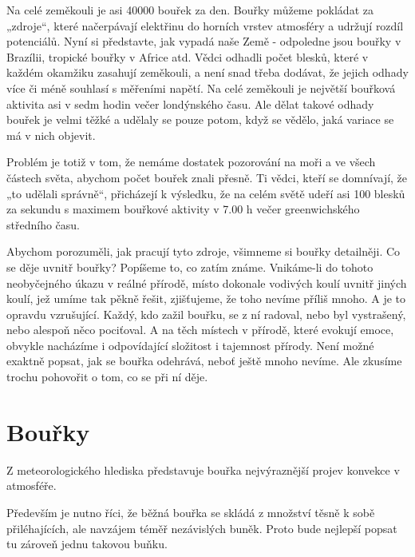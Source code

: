     Na celé zeměkouli je asi \num{40 000} bouřek za den. Bouřky můžeme pokládat za „zdroje“, které
    načerpávají elektřinu do horních vrstev atmosféry a udržují rozdíl potenciálů. Nyní si
    představte, jak vypadá naše Země - odpoledne jsou bouřky v Brazílii, tropické bouřky v Africe
    atd. Vědci odhadli počet blesků, které v každém okamžiku zasahují zeměkouli, a není snad třeba
    dodávat, že jejich odhady více či méně souhlasí s měřeními napětí. Na celé zeměkouli je největší
    bouřková aktivita asi v sedm hodin večer londýnského času. Ale dělat takové odhady bouřek je
    velmi těžké a udělaly se pouze potom, když se vědělo, jaká variace se má v nich objevit.
  
    Problém je totiž v tom, že nemáme dostatek pozorování na moři a ve všech částech světa, abychom
    počet bouřek znali přesně. Ti vědci, kteří se domnívají, že „to udělali správně“, přicházejí k
    výsledku, že na celém světě udeří asi \num{100} blesků za sekundu s maximem bouřkové aktivity v
    7.00 h večer greenwichského středního času.

    Abychom porozuměli, jak pracují tyto zdroje, všimneme si bouřky detailněji. Co se děje uvnitř
    bouřky? Popíšeme to, co zatím známe. Vnikáme-li do tohoto neobyčejného úkazu v reálné přírodě,
    místo dokonale vodivých koulí uvnitř jiných koulí, jež umíme tak pěkně řešit, zjišťujeme, že
    toho nevíme příliš mnoho. A je to opravdu vzrušující. Každý, kdo zažil bouřku, se z ní radoval,
    nebo byl vystrašený, nebo alespoň něco pociťoval. A na těch místech v přírodě, které evokují
    emoce, obvykle nacházíme i odpovídající složitost i tajemnost přírody. Není možné exaktně
    popsat, jak se bouřka odehrává, neboť ještě mnoho nevíme. Ale zkusíme trochu pohovořit o tom, co
    se při ní děje.

  \section{Bouřky}\label{fyz:IIchapIXsecIV} 
    Z meteorologického hlediska představuje bouřka nejvýraznější projev konvekce v atmosféře.

    Především je nutno říci, že běžná bouřka se skládá z množství těsně k sobě přiléhajících, ale
    navzájem téměř nezávislých buněk. Proto bude nejlepší popsat tu zároveň jednu takovou buňku.
  
